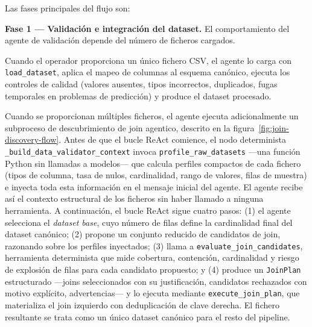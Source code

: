 Las fases principales del flujo son:

\textbf{Fase 1 --- Validación e integración del dataset.}
El comportamiento del agente de validación depende del número de ficheros cargados.

Cuando el operador proporciona un único fichero CSV, el agente lo carga con \texttt{load\_dataset}, aplica el mapeo de columnas al esquema canónico, ejecuta los controles de calidad (valores ausentes, tipos incorrectos, duplicados, fugas temporales en problemas de predicción) y produce el dataset procesado.

Cuando se proporcionan múltiples ficheros, el agente ejecuta adicionalmente un subproceso de descubrimiento de join agentico, descrito en la figura~\ref{fig:join-discovery-flow}. Antes de que el bucle ReAct comience, el nodo determinista \texttt{\_build\_data\_validator\_context} invoca \texttt{profile\_raw\_datasets} —una función Python sin llamadas a modelos— que calcula perfiles compactos de cada fichero (tipos de columna, tasa de nulos, cardinalidad, rango de valores, filas de muestra) e inyecta toda esta información en el mensaje inicial del agente. El agente recibe así el contexto estructural de los ficheros sin haber llamado a ninguna herramienta. A continuación, el bucle ReAct sigue cuatro pasos: (1) el agente selecciona el \emph{dataset base}, cuyo número de filas define la cardinalidad final del dataset canónico; (2) propone un conjunto reducido de candidatos de join, razonando sobre los perfiles inyectados; (3) llama a \texttt{evaluate\_join\_candidates}, herramienta determinista que mide cobertura, contención, cardinalidad y riesgo de explosión de filas para cada candidato propuesto; y (4) produce un \texttt{JoinPlan} estructurado —joins seleccionados con su justificación, candidatos rechazados con motivo explícito, advertencias— y lo ejecuta mediante \texttt{execute\_join\_plan}, que materializa el join izquierdo con deduplicación de clave derecha. El fichero resultante se trata como un único dataset canónico para el resto del pipeline.


